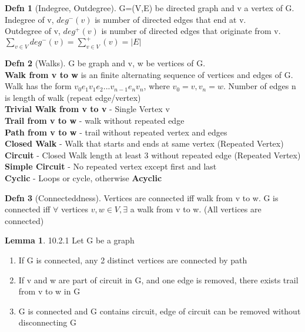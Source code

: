 \documentclass[a4paper]{article}
\theoremstyle{definition}
\newtheorem*{defn}{Defn}
\newtheorem*{lemma}{Lemma}
\begin{document}
\begin{defn}[Indegree, Outdegree] G=(V,E) be directed graph and v a vertex of G.\\ 
Indegree of v, $deg^-(v)$ is number of directed edges that end at v.\\
Outdegree of v, $deg^+(v)$ is number of directed edges that originate from v.\\
$\sum_{v\in V}deg^-(v) = \sum_{v\in V}^+(v) = |E|$
\end{defn}
\begin{defn}[Walks] G be graph and v, w be vertices of G.\\
  \textbf{Walk from v to w} is an finite alternating sequence of vertices and edges of G. Walk has the form $v_0e_1v_1e_2...v_{n-1}e_nv_n$, where $v_0=v, v_n=w$. Number of edges n is length of walk (repeat edge/vertex)\\
  \textbf{Trivial Walk from v to v} - Single Vertex v\\
  \textbf{Trail from v to w} - walk without repeated edge\\
  \textbf{Path from v to w} - trail without repeated vertex and edges\\
  \textbf{Closed Walk} - Walk that starts and ends at same vertex (Repeated Vertex)\\
  \textbf{Circuit} - Closed Walk length at least 3 without repeated edge (Repeated Vertex)\\
  \textbf{Simple Circuit} - No repeated vertex except first and last\\
  \textbf{Cyclic} - Loops or cycle, otherwise \textbf{Acyclic}
\end{defn}

\begin{defn}[Connecteddness] Vertices are connected iff walk from v to w. G is connected iff $\forall$ vertices $v, w \in V, \exists$ a walk from v to w. (All vertices are connected)
\end{defn}

\begin{lemma}{10.2.1} Let G be a graph
  \begin{enumerate}
    \item If G is connected, any 2 distinct vertices are connected by path
    \item If v and w are part of circuit in G, and one edge is removed, there exists trail from v to w in G
    \item G is connected and G contains circuit, edge of circuit can be removed without disconnecting G
  \end{enumerate}
\end{lemma}
\end{document}
